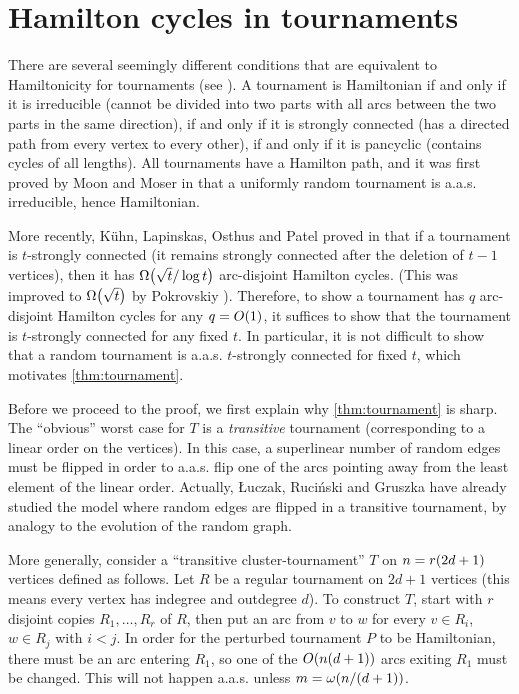 \documentclass[11pt,english]{article}
\theoremstyle{plain}
\theoremstyle{definition}
\theoremstyle{definition}
\theoremstyle{plain}
\theoremstyle{plain}
\theoremstyle{plain}
\theoremstyle{plain}
\theoremstyle{remark}
\theoremstyle{remark}
\let\originalleft\left
\let\originalright\right
\renewcommand{\left}{\mathopen{}\mathclose\bgroup\originalleft}
\renewcommand{\right}{\aftergroup\egroup\originalright}
\begin{document}
\section{\label{sec:tournaments}Hamilton cycles in tournaments}

There are several seemingly different conditions that are equivalent
to Hamiltonicity for tournaments (see \cite[Chapters~2-3]{Moo68}).
A tournament is Hamiltonian if and only if it is irreducible (cannot
be divided into two parts with all arcs between the two parts
in the same direction), if and only if it is strongly connected (has
a directed path from every vertex to every other), if and only if
it is pancyclic (contains cycles of all lengths). All tournaments
have a Hamilton path, and it was first proved by Moon and Moser in \cite{MM62} that
a uniformly random tournament is a.a.s.{} irreducible, hence Hamiltonian.

More recently, K{\"u}hn, Lapinskas, Osthus and Patel \cite{KLOP14} proved in  that if a tournament
is $t$-strongly connected (it remains strongly connected after the
deletion of $t-1$ vertices), then it has $\Omega\left(\sqrt{t}/\log t\right)$
arc-disjoint Hamilton cycles. (This was improved to $\Omega\left(\sqrt{t}\right)$
by Pokrovskiy \cite{Pok14}). Therefore, to show a tournament has $q$ arc-disjoint Hamilton cycles for any $q=O\left(1\right)$, it suffices to show that the tournament is $t$-strongly connected for any fixed $t$. In particular, it is not difficult to show that a random tournament is a.a.s.{} $t$-strongly connected for fixed $t$, which motivates \ref{thm:tournament}.

Before we proceed to the proof, we first explain why \ref{thm:tournament}
is sharp. The ``obvious'' worst case for $T$ is a \emph{transitive}
tournament (corresponding to a linear order on the vertices). In this
case, a superlinear number of random edges must be flipped in order to a.a.s.{}
flip one of the arcs pointing away from the least element of the linear
order. Actually, {\L}uczak, Ruci{\'n}ski and Gruszka \cite{LRG96} have already studied the model where random edges are flipped in a transitive
tournament, by analogy to
the evolution of the random graph.

More generally, consider a ``transitive cluster-tournament'' $T$
on $n=r\left(2d+1\right)$ vertices defined as follows. Let $R$ be a regular tournament
on $2d+1$ vertices (this means every vertex has indegree and outdegree $d$). To construct $T$, start with $r$ disjoint copies
$R_{1},\dots,R_{r}$ of $R$, then put an arc from $v$ to $w$ for
every $v\in R_{i}$, $w\in R_{j}$ with $i<j$. In order for the perturbed
tournament $P$ to be Hamiltonian, there must be an arc entering $R_{1}$,
so one of the $O\left(n\left(d+1\right)\right)$ arcs exiting $R_{1}$
must be changed. This will not happen a.a.s.{} unless $m=\omega\left(n/\left(d+1\right)\right)$.
\end{document}
